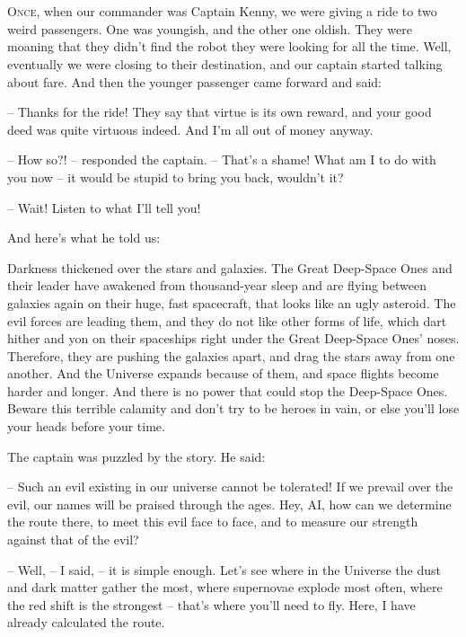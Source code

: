\documentclass[ebook,oneside,final,openright]{memoir}
\begin{document}
\chapter{}
\par
\lettrine{O}{nce,} when our commander was Captain Kenny, we were giving a ride to two weird passengers. One was youngish, and the other one oldish. They were moaning that they didn’t find the robot they were looking for all the time. Well, eventually we were closing to their destination, and our captain started talking about fare. And then the younger passenger came forward and said: \par
\par
– Thanks for the ride! They say that virtue is its own reward, and your good deed was quite virtuous indeed. And I’m all out of money anyway.\par
– How so?! – responded the captain. – That’s a shame! What am I to do with you now – it would be stupid to bring you back, wouldn’t it? \par
– Wait! Listen to what I’ll tell you! \par
 And here’s what he told us:\par
\par
Darkness thickened over the stars and galaxies. The Great Deep-Space Ones and their leader have awakened from thousand-year sleep and are flying between galaxies again on their huge, fast spacecraft, that looks like an ugly asteroid. The evil forces are leading them, and they do not like other forms of life, which dart hither and yon on their spaceships right under the Great Deep-Space Ones’ noses. Therefore, they are pushing the galaxies apart, and drag the stars away from one another. And the Universe expands because of them, and space flights become harder and longer. And there is no power that could stop the Deep-Space Ones. Beware this terrible calamity and don’t try to be heroes in vain, or else you’ll lose your heads before your time.\par
\par
The captain was puzzled by the story. He said:\par
– Such an evil existing in our universe cannot be tolerated! If we prevail over the evil, our names will be praised through the ages. Hey, AI, how can we determine the route there, to meet this evil face to face, and to measure our strength against that of the evil?\par
– Well, – I said, – it is simple enough. Let’s see where in the Universe the dust and dark matter gather the most, where supernovae explode most often, where the red shift is the strongest – that’s where you’ll need to fly. Here, I have already calculated the route.\par
\end{document}
